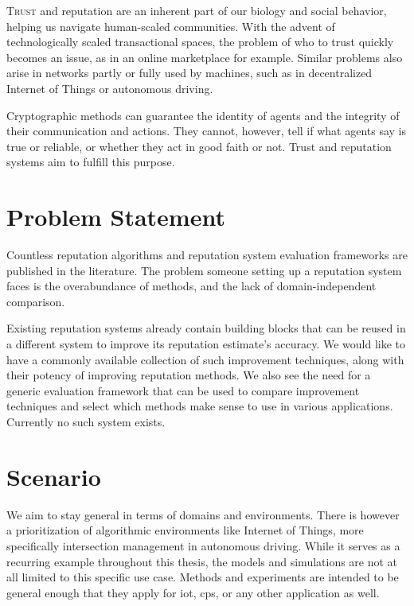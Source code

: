 \documentclass[%
    ]{\PathToTumTemplate/thesis/tum_thesis}
\begin{document}

\lettrine{T}{rust} and reputation are an inherent part of our biology and social behavior, helping us navigate human-scaled communities.
With the advent of technologically scaled transactional spaces, the problem of who to trust quickly becomes an issue, as in an online marketplace for example.
Similar problems also arise in networks partly or fully used by machines, such as in decentralized Internet of Things or autonomous driving.

Cryptographic methods can guarantee the identity of agents and the integrity of their communication and actions.
They cannot, however, tell if what agents say is true or reliable, or whether they act in good faith or not.
Trust and reputation systems aim to fulfill this purpose.



\section{Problem Statement}\label{sec:probstat}
Countless reputation algorithms and reputation system evaluation frameworks are published in the literature.
The problem someone setting up a reputation system faces is the overabundance of methods, and the lack of domain-independent comparison.

Existing reputation systems already contain building blocks that can be reused in a different system to improve its reputation estimate's accuracy.
We would like to have a commonly available collection of such improvement techniques, along with their potency of improving reputation methods.
We also see the need for a generic evaluation framework that can be used to compare improvement techniques and select which methods make sense to use in various applications.
Currently no such system exists.



\section{Scenario}

We aim to stay general in terms of domains and environments.
There is however a prioritization of algorithmic environments like Internet of Things, more specifically intersection management in autonomous driving.
While it serves as a recurring example throughout this thesis, the models and simulations are not at all limited to this specific use case.
Methods and experiments are intended to be general enough that they apply for \gls{iot}, \gls{cps}, or any other application as well.
\end{document}

